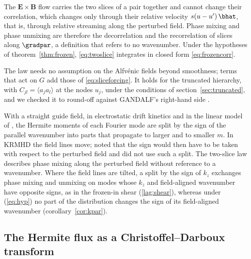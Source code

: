 The $\boldsymbol E\times\boldsymbol B$ flow carries the two slices of a pair together and cannot change their correlation, which changes only through their relative velocity $s(u-u')\,\bhat$, that is, through relative streaming along the perturbed field. Phase mixing and phase unmixing are therefore the decorrelation and the recorrelation of slices along $\gradpar$, a definition that refers to no wavenumber. Under the hypotheses of theorem~\ref{thm:frozen}, \eqref{eq:twoslice} integrates in closed form \eqref{eq:frozencorr}.

The law needs no assumption on the Alfv\'enic fields beyond smoothness; terms that act on $G$ add those of \eqref{eq:sliceforcing}. It holds for the truncated hierarchy, with $C_{jl}=\langle a_ja_l\rangle$ at the nodes $u_j$, under the conditions of section~\ref{sec:truncated}, and we checked it to round-off against GANDALF's right-hand side \citep{Kanekar2025}.

With a straight guide field, in electrostatic drift kinetics \citep{Schekochihin2016,Parker2016} and in the linear model of \citet{Kanekar2015}, the Hermite moments of each Fourier mode are split by the sign of the parallel wavenumber into parts that propagate to larger and to smaller $m$. In KRMHD the field lines move; \citet{Meyrand2019} noted that the sign would then have to be taken with respect to the perturbed field and did not use such a split. The two-slice law describes phase mixing along the perturbed field without reference to a wavenumber. Where the field lines are tilted, a split by the sign of $k_z$ exchanges phase mixing and unmixing on modes whose $k_z$ and field-aligned wavenumber have opposite signs, as in the frozen-in shear (\ref{lag:shear}), whereas under (\ref{eq:hyp}) no part of the distribution changes the sign of its field-aligned wavenumber (corollary~\ref{cor:kpar}).

\subsection{The Hermite flux as a Christoffel--Darboux transform}\label{dec:sec-flux}

